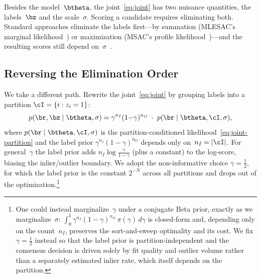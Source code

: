 \documentclass{article}
\newcommand{\mname}[1]{\texorpdfstring{#1\xspace}{#1}}
\newcommand{\msac}{\mname{MSAC}}
\newcommand{\mlesac}{\mname{MLESAC}}
\newcommand{\sortsweep}{sort-and-sweep\xspace}
\begin{document}
Besides the model~$\btheta$, the joint~\eqref{eq:joint} has two
nuisance quantities, the labels~$\bz$ and the scale~$\sigma$.
Scoring a candidate requires eliminating both.  Standard
approaches eliminate the labels first---by summation (\mlesac's
marginal likelihood~\cite{Torr2000}) or maximization (\msac's
profile likelihood~\cite{Torr1998})---and the resulting scores
still depend on~$\sigma$~\cite{Shekhovtsov2025}.

\subsection{Reversing the Elimination Order}
\label{sec:reverse-order}

We take a different path.  Rewrite the
joint~\eqref{eq:joint} by grouping labels into a partition
$\cI = \{i : z_i = 1\}$:
\begin{equation}
	p(\br, \bz \mid \btheta, \sigma)
	= \gamma^{n_I}(1{-}\gamma)^{n_O}
	\;\cdot\; p(\br \mid \btheta, \cI, \sigma),
	\label{eq:joint-partition-decomp}
\end{equation}
where $p(\br \mid \btheta, \cI, \sigma)$ is the partition-conditioned
likelihood~\eqref{eq:joint-partition} and the label prior
$\gamma^{n_I}(1{-}\gamma)^{n_O}$ depends only on~$n_I = |\cI|$.  For
general~$\gamma$ the label prior adds $n_I\log\!\tfrac{\gamma}{1-\gamma}$
(plus a constant) to the log-score, biasing the inlier/outlier
boundary.  We adopt the non-informative choice $\gamma = \tfrac{1}{2}$,
for which the label prior is the constant $2^{-N}$ across all
partitions and drops out of the optimization.\footnote{One could instead
	marginalize~$\gamma$ under a conjugate Beta prior, exactly as we
	marginalize~$\sigma$: $\int_0^1
		\gamma^{n_I}(1{-}\gamma)^{n_O}\,\pi(\gamma)\,d\gamma$ is closed-form
	and, depending only on the count~$n_I$, preserves the \sortsweep
	optimality and its cost.  We fix $\gamma=\tfrac12$ instead so that the
	label prior is partition-independent and the consensus decision is
	driven solely by fit quality and outlier volume rather than a
	separately estimated inlier rate, which itself depends on the
	partition.}
\end{document}
